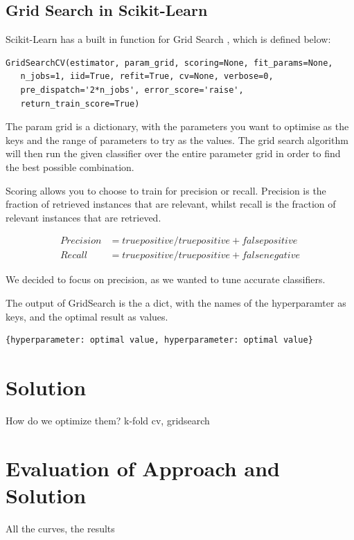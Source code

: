\documentclass{article}
\begin{document}
	\subsection{Grid Search in Scikit-Learn}
	
		Scikit-Learn has a built in function for Grid Search \cite{gridsearch}, which is defined below:
		
		
	\begin{lstlisting}
GridSearchCV(estimator, param_grid, scoring=None, fit_params=None, 
   n_jobs=1, iid=True, refit=True, cv=None, verbose=0, 
   pre_dispatch='2*n_jobs', error_score='raise',
   return_train_score=True)
	\end{lstlisting}
		
		The param \textunderscore grid is a dictionary, with the parameters you want to optimise as the keys and the range of parameters to try as the values. The grid search algorithm will then run the given classifier over the entire parameter grid in order to find the best possible combination. 
		
		Scoring allows you to choose to train for precision or recall. Precision is the fraction of retrieved instances that are relevant, whilst recall is the fraction of relevant instances that are retrieved.
		
		\begin{align*}
		Precision &= true positive / true positive + false positive\\
		Recall &= true positive / true positive + false negative 
		\end{align*}
		
		We decided to focus on precision, as we wanted to tune accurate classifiers. 
		
		The output of GridSearch is the a dict, with the names of the hyperparamter as keys, and the optimal result as values. 
		
		\begin{lstlisting}
{hyperparameter: optimal value, hyperparameter: optimal value}
		\end{lstlisting}

\newpage

\section{Solution}
	How do we optimize them? k-fold cv, gridsearch
\newpage

\section{Evaluation of Approach and Solution} 
	All the curves, the results
\end{document}
